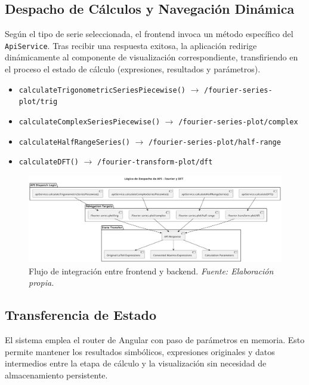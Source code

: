 \subsection{Despacho de Cálculos y Navegación Dinámica}

Según el tipo de serie seleccionada, el frontend invoca un método específico del \texttt{ApiService}. Tras recibir una respuesta exitosa, la aplicación redirige dinámicamente al componente de visualización correspondiente, transfiriendo en el proceso el estado de cálculo (expresiones, resultados y parámetros).

\begin{itemize}
	\item \texttt{calculateTrigonometricSeriesPiecewise()} $\rightarrow$ \texttt{/fourier-series-plot/trig}
	\item \texttt{calculateComplexSeriesPiecewise()} $\rightarrow$ \texttt{/fourier-series-plot/complex}
	\item \texttt{calculateHalfRangeSeries()} $\rightarrow$ \texttt{/fourier-series-plot/half-range}
	\item \texttt{calculateDFT()} $\rightarrow$ \texttt{/fourier-transform-plot/dft}
\end{itemize}

\begin{figure}[H]
	\centering
	\includegraphics[width=1\textwidth]{img/chapter07/api-dispatch.pdf}
	\caption[Flujo de integración entre frontend y backend.]{Flujo de integración entre frontend y backend. \textit{Fuente: Elaboración propia.}}
	\label{fig:frontend-backend-dispatch}
\end{figure}

\subsection{Transferencia de Estado}

El sistema emplea el router de Angular con paso de parámetros en memoria. Esto permite mantener los resultados simbólicos, expresiones originales y datos intermedios entre la etapa de cálculo y la visualización sin necesidad de almacenamiento persistente.

